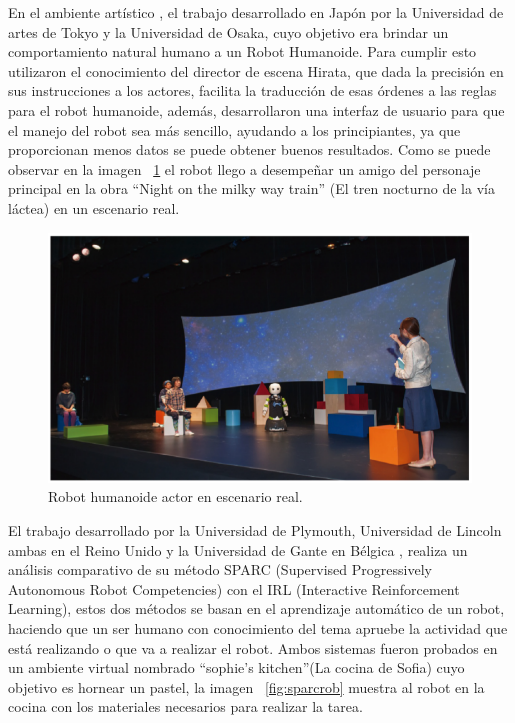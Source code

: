 En el ambiente artístico \cite{Nishiguchi2017}, el trabajo desarrollado en
 Japón por la Universidad de artes de Tokyo y la Universidad de Osaka, cuyo
 objetivo era brindar un comportamiento natural humano a un Robot Humanoide.
 Para cumplir esto utilizaron el conocimiento del director de escena Hirata,
 que dada la precisión en sus instrucciones a los actores, facilita la
 traducción de esas órdenes a las reglas para el robot humanoide, además,
 desarrollaron una interfaz de usuario para que el manejo del robot sea más
 sencillo, ayudando a los principiantes, ya que proporcionan menos datos se
 puede obtener buenos resultados. Como se puede observar en la imagen
 ~\ref{fig:theatricalrob} el robot llego a desempeñar un amigo del
 personaje principal en la obra ``Night on the milky way train''
 (El tren nocturno de la vía láctea) en un escenario real.


\begin{figure}[H]
\centering
\includegraphics[width=0.8\columnwidth]{CapituloI/Imagenes/Theatrical.png}
\caption{Robot humanoide actor en escenario real.}
\label{fig:theatricalrob}
\end{figure} 


El trabajo desarrollado por la Universidad de Plymouth, Universidad de
 Lincoln ambas en el Reino Unido y la Universidad de Gante en Bélgica
 \cite{Senft2016}, realiza un análisis comparativo de su método SPARC (Supervised
 Progressively Autonomous Robot Competencies) con el IRL (Interactive
 Reinforcement Learning), estos dos métodos se basan en el aprendizaje 
 automático de un robot, haciendo que un ser humano con conocimiento del tema
 apruebe la actividad que está realizando o que va a realizar el robot.
 Ambos sistemas fueron probados en un ambiente virtual nombrado ``sophie’s
 kitchen''(La cocina de Sofia) cuyo objetivo es hornear un pastel, 
 la imagen ~\ref{fig:sparcrob} muestra al robot en la cocina con los materiales
 necesarios para realizar la tarea. 
 
